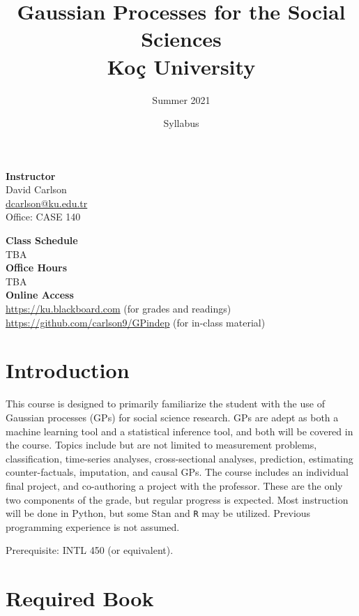 \documentclass[12pt]{article}
\title{Gaussian Processes for the Social Sciences\\
{\Large Ko\c{c} University}}
\author{Summer 2021}
\date{Syllabus}
\begin{document}
\maketitle

\hline
\vspace{2em}
\begin{minipage}[t]{.3\linewidth}
\textbf{Instructor}\\
David Carlson\\
\href{mailto:dcarlson@ku.edu.tr}{dcarlson@ku.edu.tr}\\
Office: CASE 140
\end{minipage}
\begin{minipage}[t]{.7\linewidth}
\textbf{Class Schedule}\\
TBA\\
\textbf{Office Hours}\\
TBA\\
\textbf{Online Access}\\
\href{https://ku.blackboard.com}{https://ku.blackboard.com} (for grades and readings)\\
\href{https://github.com/carlson9/GPindep}{https://github.com/carlson9/GPindep} (for in-class material)
\end{minipage}
\vspace{2em}
\hline

\section*{Introduction}

\noindent This course is designed to primarily familiarize the student with the use of Gaussian processes (GPs) for social science research. GPs are adept as both a machine learning tool and a statistical inference tool, and both will be covered in the course. Topics include but are not limited to measurement problems, classification, time-series analyses, cross-sectional analyses, prediction, estimating counter-factuals, imputation, and causal GPs. The course includes an individual final project, and co-authoring a project with the professor. These are the only two components of the grade, but regular progress is expected. Most instruction will be done in Python, but some Stan and \texttt{R} may be utilized. Previous programming experience is not assumed.

\noindent Prerequisite: INTL 450 (or equivalent).

\section*{Required Book}
\end{document}
